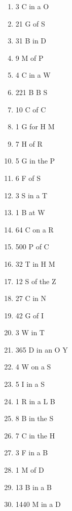 \documentclass[10pt]{article}
\begin{document}
\begin{multicols}{4}
\begin{enumerate}[label=\arabic*.]
    \item 3 \w C{}  in a \w O{}
     \item 21 \w G{}  of \w S{}
     \item 31 \w B{}  in \w D{}
     \item 9 \w M{}  of \w P{}
     \item 4 \w C{}  in a \w W{}
     
    \item 221 \w B{}  B \w S{}
     \item 10 \w C{}  of \w C{}
     \item 1 \w G{}  for \w H{}  M
    \item 7 \w H{}  of \w R{}
     \item 5 \w G{}  in the \w P{}
     
    \item 6 \w F{}  of \w S{}
     \item 3 \w S{}  in a \w T{}
     \item 1 \w B{}  at \w W{}
     \item 64 \w C{}  on a \w R{}
     \item 500 \w P{}  of \w C{}
     
    \item 32 \w T{}  in \w H{}  M
    \item 12 \w S{}  of the \w Z{}
     \item 27 \w C{}  in \w N{}
     \item 42 \w G{}  of \w I{}
     \item 3 \w W{}  in \w T{}
     
    \item 365 \w D{}  in an \w O{}  Y
    \item 4 \w W{}  on a \w S{}
     \item 5 \w I{}  in a \w S{}
     \item 1 \w R{}  in a \w L{}  B
    \item 8 \w B{}  in the \w S{}
     
    \item 7 \w C{}  in the \w H{}
     \item 3 \w F{}  in a \w B{}
     \item 1 \w M{}  of \w D{}
     \item 13 \w B{}  in a \w B{}
     \item 1440 \w M{}  in a \w D{}
     

\end{enumerate}
\end{multicols}
\end{document}
